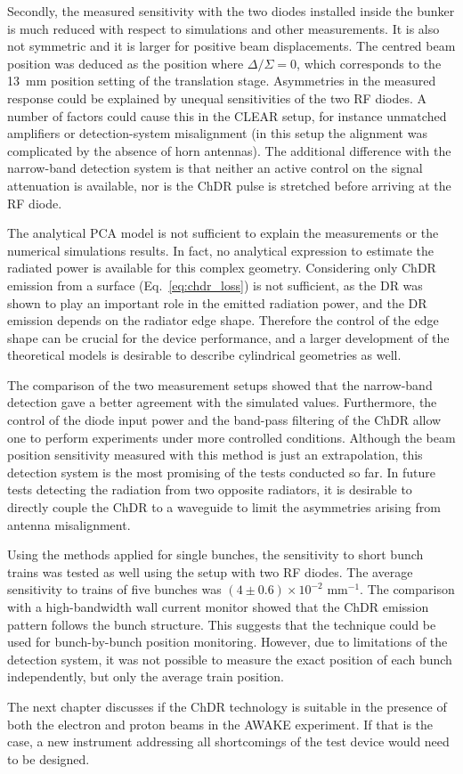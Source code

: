 Secondly, the measured sensitivity with the two diodes installed inside the bunker is much reduced with respect to simulations and other measurements. It is also not symmetric and it is larger for positive beam displacements. The centred beam position was deduced as the position where $\Delta/\Sigma=0$, which corresponds to the 13~mm position setting of the translation stage. Asymmetries in the measured response could be explained by unequal sensitivities of the two RF diodes. A number of factors could cause this in the CLEAR setup, for instance unmatched amplifiers or detection-system misalignment (in this setup the alignment was complicated by the absence of horn antennas). The additional difference with the narrow-band detection system is that neither an active control on the signal attenuation is available, nor is the ChDR pulse is stretched before arriving at the RF diode. 


The analytical PCA model is not sufficient to explain the measurements or the numerical simulations results. In fact, no analytical expression to estimate the radiated power is available for this complex geometry. Considering only ChDR emission from a surface (Eq.~\ref{eq:chdr_loss}) is not sufficient, as the DR was shown to play an important role in the emitted radiation power, and the DR emission depends on the radiator edge shape. Therefore the control of the edge shape can be crucial for the device performance, and a larger development of the theoretical models is desirable to describe cylindrical geometries as well. 

The comparison of the two measurement setups showed that the narrow-band detection gave a better agreement with the simulated values. Furthermore, the control of the diode input power and the band-pass filtering of the ChDR allow one to perform experiments under more controlled conditions. Although the beam position sensitivity measured with this method is just an extrapolation, this detection system is the most promising of the tests conducted so far. In future tests detecting the radiation from two opposite radiators, it is desirable to directly couple the ChDR to a waveguide to limit the asymmetries arising from antenna misalignment.

Using the methods applied for single bunches, the sensitivity to short bunch trains was tested as well using the setup with two RF diodes. The average sensitivity to trains of five bunches was ${(4\pm0.6) \times 10^{-2}\text{ mm}^{-1}}$. The comparison with a high-bandwidth wall current monitor showed that the ChDR emission pattern follows the bunch structure. This suggests that the technique could be used for bunch-by-bunch position monitoring. However, due to limitations of the detection system, it was not possible to measure the exact position of each bunch independently, but only the average train position.

The next chapter discusses if the ChDR technology is suitable in the presence of both the electron and proton beams in the AWAKE experiment. If that is the case, a new instrument addressing all shortcomings of the test device would need to be designed.


